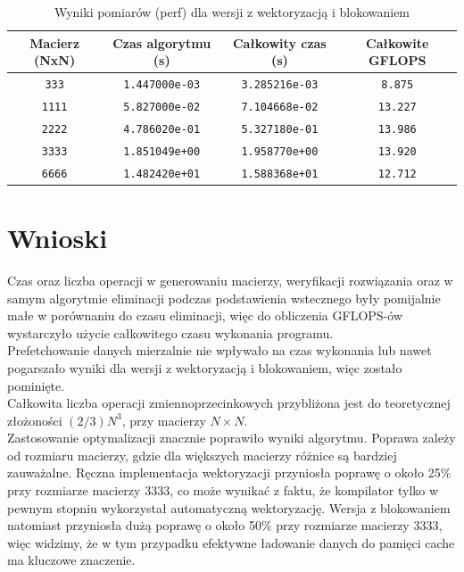 \documentclass[12pt]{article}
\begin{document}
\begin{table}[H]
  \centering
  \begin{tabular}{|c|c|c|c|}
    \hline
    \textbf{Macierz (NxN)} & \textbf{Czas algorytmu (s)} & \textbf{Całkowity czas (s)} & \textbf{Całkowite GFLOPS} \\
    \hline
    \verb|333|  & \verb|1.447000e-03| & \verb|3.285216e-03| & \verb|8.875| \\
    \hline
    \verb|1111| & \verb|5.827000e-02| & \verb|7.104668e-02| & \verb|13.227| \\
    \hline
    \verb|2222| & \verb|4.786020e-01| & \verb|5.327180e-01| & \verb|13.986| \\
    \hline
    \verb|3333| & \verb|1.851049e+00| & \verb|1.958770e+00| & \verb|13.920| \\
    \hline
    \verb|6666| & \verb|1.482420e+01| & \verb|1.588368e+01| & \verb|12.712| \\
    \hline
  \end{tabular}
  \caption{Wyniki pomiarów (perf) dla wersji z wektoryzacją i blokowaniem}
\end{table}

\newpage








\section*{Wnioski}
Czas oraz liczba operacji w generowaniu macierzy, weryfikacji rozwiązania 
oraz w samym algorytmie eliminacji podczas podstawienia wstecznego były pomijalnie
małe w porównaniu do czasu eliminacji, więc do obliczenia GFLOPS-ów wystarczyło użycie
całkowitego czasu wykonania programu. \\

Prefetchowanie danych mierzalnie nie wpływało na czas wykonania lub nawet pogarszało 
wyniki dla wersji z wektoryzacją i blokowaniem, więc zostało pominięte. \\

Całkowita liczba operacji zmiennoprzecinkowych przybliżona jest do teoretycznej złożoności
$(2/3)N^3$, przy macierzy $N \times N$. \\

Zastosowanie optymalizacji znacznie poprawiło wyniki algorytmu. Poprawa zależy od rozmiaru macierzy,
gdzie dla większych macierzy różnice są bardziej zauważalne. Ręczna implementacja wektoryzacji 
przyniosła poprawę o około 25\% przy rozmiarze macierzy 3333, co może wynikać z faktu, że 
kompilator tylko w pewnym stopniu wykorzystał automatyczną wektoryzację.
Wersja z blokowaniem natomiast przyniosła dużą poprawę o około 50\% przy rozmiarze macierzy 3333, 
więc widzimy, że w tym przypadku efektywne ładowanie danych do pamięci cache ma kluczowe znaczenie. 
\end{document}
